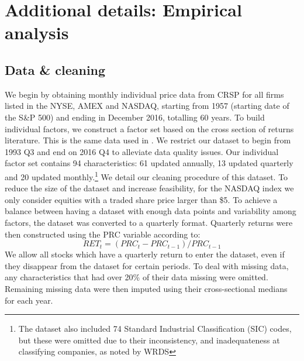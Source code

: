 \documentclass{article}
\begin{document}
\newpage

\section{Additional details: Empirical analysis}
\label{empirical_appendix}

\subsection{Data \& cleaning}\label{app:clean}
We begin by obtaining monthly individual price data from CRSP for all firms listed in the NYSE, AMEX and NASDAQ, starting from 1957 (starting date of the S\&P 500) and ending in December 2016, totalling 60 years. To build individual factors, we construct a factor set based on the cross section of returns literature. This is the same data used in \cite{gu_empirical_2019}. We restrict our dataset to begin from 1993 Q3 and end on 2016 Q4 to alleviate data quality issues. Our individual factor set contains 94 characteristics: 61 updated annually, 13 updated quarterly and 20 updated monthly.\footnote{The dataset also included 74 Standard Industrial Classification (SIC) codes, but these were omitted due to their inconsistency, and inadequateness at classifying companies, as noted by WRDS}
We detail our cleaning procedure of this dataset. To reduce the size of the dataset and increase feasibility, for the NASDAQ index we only consider equities with a traded share price larger than \$5. To achieve a balance between having a dataset with enough data points and variability among factors, the dataset was converted to a quarterly format. Quarterly returns were then constructed using the PRC variable according to:
\begin{equation}
RET_t = (PRC_t - PRC_{t-1})/PRC_{t-1}
\end{equation}
We allow all stocks which have a quarterly return to enter the dataset, even if they disappear from the dataset for certain periods. To deal with missing data, any characteristics that had over 20\% of their data missing were omitted. Remaining missing data were then imputed using their cross-sectional medians for each year. 
\end{document}
